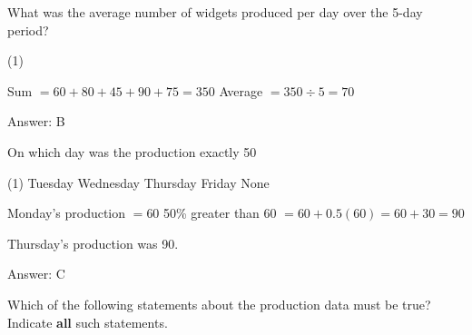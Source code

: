 \documentclass[11pt,paper=a4,answers]{exam}
\begin{document}
\begin{questions}
\begin{center}
\end{center}

\question
What was the average number of widgets produced per day over the 5-day period?

\begin{tasks}(1)
    
\end{tasks}

\begin{solution}
\begin{center}
Sum $= 60 + 80 + 45 + 90 + 75 = 350$
\vspace{5pt}
Average $= 350 \div 5 = 70$
\end{center}

Answer: \colorbox{yellow!100}{B}
\end{solution}

\vspace{1cm}

\question
On which day was the production exactly 50%

\begin{tasks}(1)
\task[A)] Tuesday \task[B)] Wednesday \task[C)] Thursday \task[D)] Friday \task[E)] None
\end{tasks}

\begin{solution}
\begin{center}
Monday's production $= 60$
\vspace{5pt}
50\% greater than 60 $= 60 + 0.5(60) = 60 + 30 = 90$
\end{center}
\vspace{5pt}
Thursday's production was 90.

Answer: \colorbox{yellow!100}{C}
\end{solution}

\vspace{1cm}

\question
Which of the following statements about the production data must be true?
Indicate \textbf{all} such statements.


\end{questions}
\end{document}
